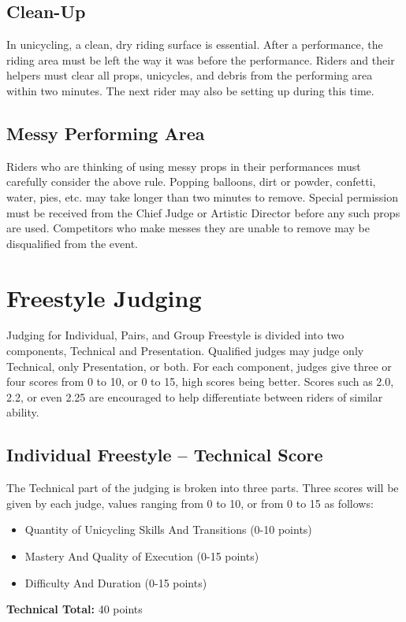 \section{Clean-Up}
In unicycling, a clean, dry riding surface is essential.
After a performance, the riding area must be left the way it was before the performance.
Riders and their helpers must clear all props, unicycles, and debris from the performing area within two minutes.
The next rider may also be setting up during this time.

\section{Messy Performing Area}
Riders who are thinking of using messy props in their performances must carefully consider the above rule.
Popping balloons, dirt or powder, confetti, water, pies, etc.
may take longer than two minutes to remove.
Special permission must be received from the Chief Judge or Artistic Director before any such props are used.
Competitors who make messes they are unable to remove may be disqualified from the event.

\chapter{Freestyle Judging}

Judging for Individual, Pairs, and Group Freestyle is divided into two components, Technical and Presentation.
Qualified judges may judge only Technical, only Presentation, or both.
For each component, judges give three or four scores from 0 to 10, or 0 to 15, high scores being better.
Scores such as 2.0, 2.2, or even 2.25 are encouraged to help differentiate between riders of similar ability.

\section{Individual Freestyle -- Technical Score \label{sec:freestyle_individual-technical-score}}
The Technical part of the judging is broken into three parts.
Three scores will be given by each judge, values ranging from 0 to 10, or from 0 to 15 as follows: 
\begin{itemize}
\item Quantity of Unicycling Skills And Transitions (0-10 points) 
\item Mastery And Quality of Execution (0-15 points) 
\item Difficulty And Duration (0-15 points) 
\end{itemize}
\textbf{Technical Total:} 40 points

